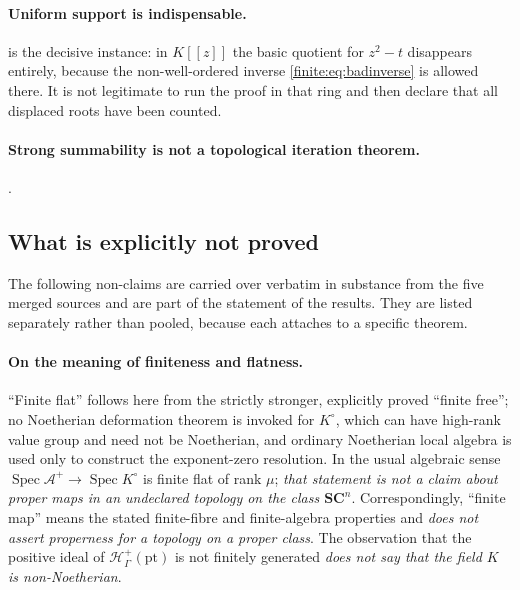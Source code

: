 \documentclass[11pt,letterpaper]{article}
\theoremstyle{definition}
\theoremstyle{remark}
\newcommand{\SC}{\mathbf{SC}}
\newcommand{\Hp}{\mathscr H^{+}}
\newcommand{\Alg}{\mathcal A}
\newcommand{\Kc}{K^{\circ}}
\DeclareMathOperator{\Spec}{Spec}
\numberwithin{equation}{section}
\begin{document}
\paragraph{Uniform support is indispensable.}  is the decisive instance: in $K[[z]]$ the basic quotient for $z^2-t$ disappears entirely, because the non-well-ordered inverse \eqref{finite:eq:badinverse} is allowed there. It is not legitimate to run the proof in that ring and then declare that all displaced roots have been counted.

\paragraph{Strong summability is not a topological iteration theorem.} .

\subsection{What is explicitly not proved}
\label{finite:sec:notproved}

The following non-claims are carried over verbatim in substance from the five merged sources and are part of the statement of the results. They are listed separately rather than pooled, because each attaches to a specific theorem.

\paragraph{On the meaning of finiteness and flatness.}
``Finite flat'' follows here from the strictly stronger, explicitly proved ``finite free''; no Noetherian deformation theorem is invoked for $\Kc$, which can have high-rank value group and need not be Noetherian, and ordinary Noetherian local algebra is used only to construct the exponent-zero resolution. In the usual algebraic sense $\Spec\Alg^+\to\Spec\Kc$ is finite flat of rank $\mu$; \emph{that statement is not a claim about proper maps in an undeclared topology on the class $\SC^n$}. Correspondingly, ``finite map'' means the stated finite-fibre and finite-algebra properties and \emph{does not assert properness for a topology on a proper class}. The observation that the positive ideal of $\Hp_\Gamma(\mathrm{pt})$ is not finitely generated \emph{does not say that the field $K$ is non-Noetherian}.
\end{document}
